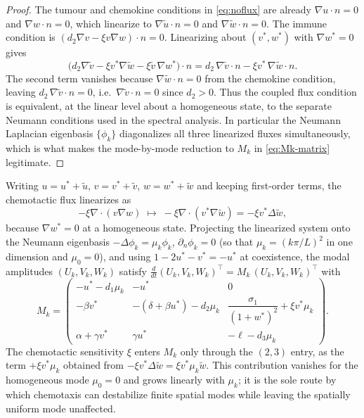 \documentclass[a4paper,fleqn,longmktitle]{cas-sc}
\theoremstyle{plain}
\theoremstyle{definition}
\numberwithin{equation}{section}
\begin{document}
\begin{proof}
The tumour and chemokine conditions in \eqref{eq:noflux} are already
$\nabla u\cdot n=0$ and $\nabla w\cdot n=0$, which linearize to
$\nabla\widetilde u\cdot n=0$ and $\nabla\widetilde w\cdot n=0$. The immune
condition is $(d_2\nabla v-\xi v\nabla w)\cdot n=0$. Linearizing about
$(v^*,w^*)$ with $\nabla w^*=0$ gives
\[
\big(d_2\nabla\widetilde v-\xi v^*\nabla\widetilde w-\xi\widetilde v\,\nabla w^*\big)\cdot n
= d_2\,\nabla\widetilde v\cdot n-\xi v^*\,\nabla\widetilde w\cdot n .
\]
The second term vanishes because $\nabla\widetilde w\cdot n=0$ from the chemokine
condition, leaving $d_2\,\nabla\widetilde v\cdot n=0$, i.e.\
$\nabla\widetilde v\cdot n=0$ since $d_2>0$. Thus the coupled flux condition is
equivalent, at the linear level about a homogeneous state, to the separate
Neumann conditions used in the spectral analysis. In particular the Neumann
Laplacian eigenbasis $\{\phi_k\}$ diagonalizes all three linearized fluxes
simultaneously, which is what makes the mode-by-mode reduction to $M_k$ in \eqref{eq:Mk-matrix}
legitimate.
\end{proof}

Writing $u=u^*+\widetilde u$, $v=v^*+\widetilde v$, $w=w^*+\widetilde w$ and
keeping first-order terms, the chemotactic flux linearizes as
\[
-\xi\nabla\cdot(v\nabla w)
\;\longmapsto\;
-\xi\nabla\cdot(v^*\nabla\widetilde w)
=
-\xi v^*\Delta\widetilde w,
\]
because $\nabla w^*=0$ at a homogeneous state. Projecting the linearized system
onto the Neumann eigenbasis $-\Delta\phi_k=\mu_k\phi_k$, $\partial_n\phi_k=0$
(so that $\mu_k=(k\pi/L)^2$ in one dimension and $\mu_0=0$), and using
$1-2u^*-v^*=-u^*$ at coexistence, the modal amplitudes
$(U_k,V_k,W_k)$ satisfy $\tfrac{d}{dt}(U_k,V_k,W_k)^\top
=M_k\,(U_k,V_k,W_k)^\top$ with
\begin{equation}\label{eq:Mk-matrix}
M_k=
\begin{pmatrix}
-u^*-d_1\mu_k & -u^* & 0\\[2mm]
-\beta v^* & -(\delta+\beta u^*)-d_2\mu_k &
\dfrac{\sigma_1}{(1+w^*)^2}+\xi v^*\mu_k\\[3mm]
\alpha+\gamma v^* & \gamma u^* & -\ell-d_3\mu_k
\end{pmatrix}.
\end{equation}
The chemotactic sensitivity $\xi$ enters $M_k$ only through the $(2,3)$ entry, as
the term $+\xi v^*\mu_k$ obtained from
$-\xi v^*\Delta\widetilde w=\xi v^*\mu_k\widetilde w$. This contribution vanishes
for the homogeneous mode $\mu_0=0$ and grows linearly with $\mu_k$; it is the
sole route by which chemotaxis can destabilize finite spatial modes while leaving
the spatially uniform mode unaffected.
\end{document}
